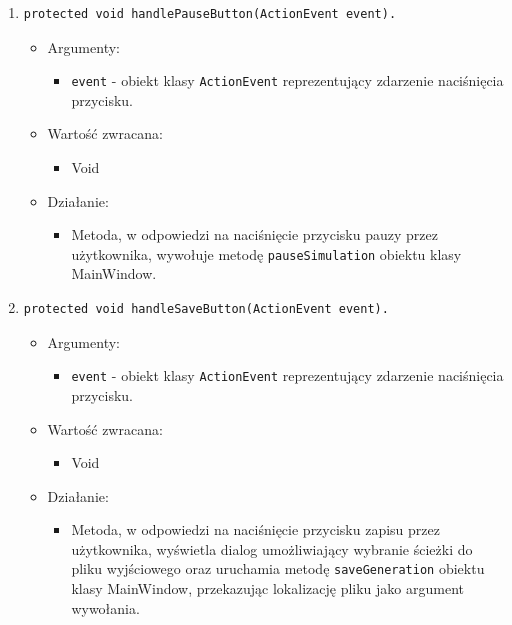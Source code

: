 \documentclass[a4paper,11pt, notitlepage ]{article}
\begin{document}
\begin{enumerate}
\item \begin{verbatim}protected void handlePauseButton(ActionEvent event). \end{verbatim}
\begin{itemize}
\item Argumenty:
\begin{itemize}
\item \verb+event+ - obiekt klasy \verb+ActionEvent+ reprezentujący zdarzenie naciśnięcia przycisku.
\end{itemize}
\item Wartość zwracana:
\begin{itemize}
\item Void
\end{itemize}
\item Działanie:
\begin{itemize}
\item Metoda, w odpowiedzi na naciśnięcie przycisku pauzy przez użytkownika, wywołuje metodę \verb+pauseSimulation+ obiektu klasy MainWindow.
\end{itemize}
\end{itemize}


\item \begin{verbatim}protected void handleSaveButton(ActionEvent event). \end{verbatim}
\begin{itemize}
\item Argumenty:
\begin{itemize}
\item \verb+event+ - obiekt klasy \verb+ActionEvent+ reprezentujący zdarzenie naciśnięcia przycisku.
\end{itemize}
\item Wartość zwracana:
\begin{itemize}
\item Void
\end{itemize}
\item Działanie:
\begin{itemize}
\item Metoda, w odpowiedzi na naciśnięcie przycisku zapisu przez użytkownika, wyświetla dialog umożliwiający wybranie ścieżki do pliku wyjściowego oraz uruchamia metodę \verb+saveGeneration+ obiektu klasy MainWindow, przekazując lokalizację pliku jako argument wywołania.
\end{itemize}
\end{itemize}




\end{enumerate}
\end{document}
